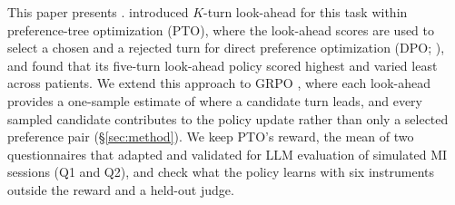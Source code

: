 This paper presents \textbf{\LAGRPO}. \citet{baruch2025pto} introduced $K$-turn look-ahead for this task within preference-tree optimization (PTO), where the look-ahead scores are used to select a chosen and a rejected turn for direct preference optimization (DPO; \citealp{rafailov2023dpo}), and found that its five-turn look-ahead policy scored highest and varied least across patients. We extend this approach to GRPO \citep{shao2024deepseekmath}, where each look-ahead provides a one-sample estimate of where a candidate turn leads, and every sampled candidate contributes to the policy update rather than only a selected preference pair (\S\ref{sec:method}). We keep PTO's reward, the mean of two questionnaires that \citet{yosef2024assessing} adapted and validated for LLM evaluation of simulated MI sessions (Q1 and Q2), and check what the policy learns with six instruments outside the reward and a held-out judge.


